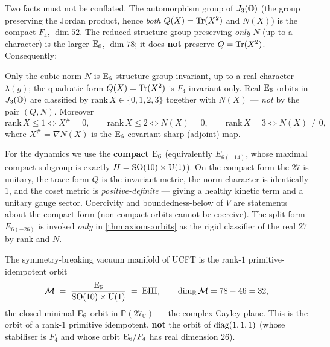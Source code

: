 Two facts must not be conflated. The automorphism group of $J_3(\mathbb{O})$ (the group
preserving the Jordan product, hence \emph{both} $Q(X)=\operatorname{Tr}(X^2)$ and $N(X)$)
is the compact $F_4$, $\dim 52$. The reduced structure group preserving
\emph{only} $N$ (up to a character) is the larger $\mathrm{E}_{6}$, $\dim 78$; it does
\textbf{not} preserve $Q=\operatorname{Tr}(X^2)$. Consequently:

\begin{theorem}\label{thm:axioms:orbits}
Only the cubic norm $N$ is $\mathrm{E}_{6}$ structure-group invariant, up to a real
character $\lambda(g)$; the quadratic form $Q(X)=\operatorname{Tr}(X^2)$ is
$F_4$-invariant only. Real $\mathrm{E}_{6}$-orbits in $J_3(\mathbb{O})$ are classified by
$\mathrm{rank}\,X\in\{0,1,2,3\}$ together with $N(X)$ ---
\emph{not} by the pair $(Q,N)$. Moreover
\[
  \mathrm{rank}\,X\le1\iff X^{\#}=0,\qquad
  \mathrm{rank}\,X\le2\iff N(X)=0,\qquad
  \mathrm{rank}\,X=3\iff N(X)\neq0,
\]
where $X^{\#}=\nabla N(X)$ is the $\mathrm{E}_{6}$-covariant sharp (adjoint) map.
\end{theorem}

\begin{remark}\label{rem:axioms:compact}
For the dynamics we use the \textbf{compact} $\mathrm{E}_{6}$ (equivalently
$E_{6(-14)}$, whose maximal compact subgroup is exactly
$H=\mathrm{SO}(10)\times\mathrm{U}(1)$). On the compact form the $27$ is unitary, the trace
form $Q$ is the invariant metric, the norm character is identically $1$, and
the coset metric is \emph{positive-definite} --- giving a healthy kinetic
term and a unitary gauge sector. Coercivity and boundedness-below of $V$ are
statements about the compact form (non-compact orbits cannot be coercive).
The split form $E_{6(-26)}$ is invoked \emph{only} in
\autoref{thm:axioms:orbits} as the rigid classifier of the real $27$ by rank
and $N$.
\end{remark}

\begin{theorem}[Vacuum manifold $=$ EIII]\label{thm:axioms:eiii}
The symmetry-breaking vacuum manifold of UCFT is the rank-$1$
primitive-idempotent orbit
\begin{equation}\label{eq:axioms:eiii}
  \mathcal{M} \;=\; \frac{\mathrm{E}_{6}}{\mathrm{SO}(10)\times\mathrm{U}(1)} \;=\; \mathrm{EIII},
  \qquad \dim_{\mathbb R}\mathcal{M} = 78-46 = 32,
\end{equation}
the closed minimal $\mathrm{E}_{6}$-orbit in $\mathbb P(27_{\mathbb C})$ --- the
complex Cayley plane. This is the orbit of a rank-$1$ primitive idempotent,
\textbf{not} the orbit of $\operatorname{diag}(1,1,1)$ (whose stabiliser is $F_4$ and whose
orbit $\mathrm{E}_{6}/F_4$ has real dimension $26$).
\end{theorem}

